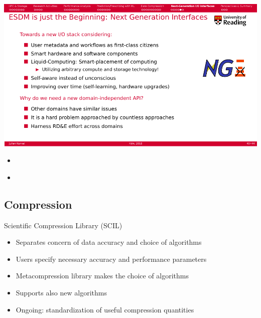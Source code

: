 \documentclass[compress,11pt,xcolor=svgnames,aspectratio=169]{beamer}
\begin{document}
\begin{frame}[fragile]{}

\begin{center}
\includegraphics[scale=0.6]{fig/esdm-4}
\end{center}

\end{frame}

\begin{frame}[fragile]{}

\begin{itemize}

    \item

\end{itemize}

\end{frame}

\begin{frame}[fragile]{}

\begin{itemize}

    \item

\end{itemize}

\end{frame}

\subsection{Compression}

\begin{frame}[fragile]{Scientific Compression Library (SCIL)}

\begin{itemize}

    \item Separates concern of data accuracy and choice of algorithms
    \item Users specify necessary accuracy and performance parameters
    \item Metacompression library makes the choice of algorithms
    \item Supports also new algorithms
    \item Ongoing: standardization of useful compression quantities

\end{itemize}

\end{frame}
\end{document}
